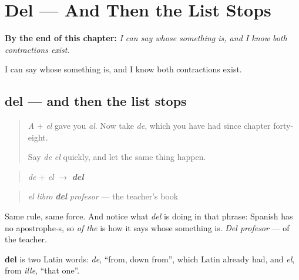 
\chapter{Del --- And Then the List Stops}
\label{ch:del}

\begin{chapteropening}
\textbf{By the end of this chapter:} \emph{I can say whose something is, and I know both contractions exist.}

I can say whose something is, and I know both contractions exist.
\end{chapteropening}

\section[del]{del — and then the list stops}

\label{lesson:ES-C61-del}



\begin{quote}
\emph{A} + \emph{el} gave you \emph{al}. Now take \emph{de}, which you have had since chapter forty-eight.

Say \emph{de el} quickly, and let the same thing happen.
\end{quote}

\begin{grammarlens}[title={Grammar Lens: the second squeeze}]
\begin{quote}
\emph{de} + \emph{el} $\to$ \emph{\textbf{del}}
\end{quote}

\begin{quote}
\emph{el libro} \emph{\textbf{del}} \emph{profesor} — the teacher's book
\end{quote}

Same rule, same force. And notice what \emph{del} is doing in that phrase: Spanish has no apostrophe-s, so \emph{of the} is how it says whose something is. \emph{Del profesor} — of the teacher.
\end{grammarlens}

\begin{cousinweb}
\textbf{del} is two Latin words: \emph{de}, \textquotedblleft{}from, down from\textquotedblright{}, which Latin already had, and \emph{el}, from \emph{ille}, \textquotedblleft{}that one\textquotedblright{}.
\end{cousinweb}

